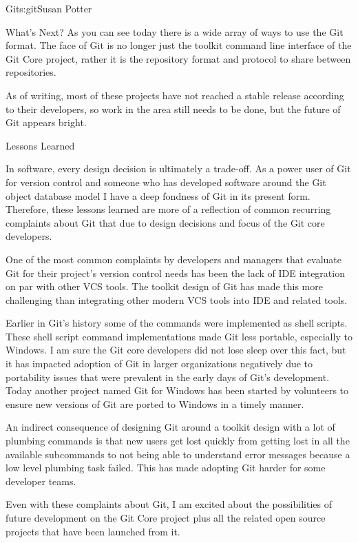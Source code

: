 \begin{aosachapter}{Git}{s:git}{Susan Potter}
\begin{aosasect1}{What's Next?}
As you can see today there is a wide array of ways to use the Git format.
The face of Git is no longer just the toolkit command line interface of
the Git Core project, rather it is the repository format and protocol to
share between repositories.

As of writing, most of these projects have not reached a stable release
according to their developers, so work in the area still needs to be done,
but the future of Git appears bright.

\end{aosasect1}

\begin{aosasect1}{Lessons Learned}

In software, every design decision is ultimately a trade-off. As a power
user of Git for version control and someone who has developed software
around the Git object database model I have a deep fondness of Git in its
present form. Therefore, these lessons learned are more of a reflection
of common recurring complaints about Git that due to design decisions and
focus of the Git core developers.

One of the most common complaints by developers and managers that evaluate
Git for their project's version control needs has been the lack of IDE
integration on par with other VCS tools. The toolkit design of Git has made
this more challenging than integrating other modern VCS tools into IDE
and related tools.

Earlier in Git's history some of the commands were implemented as shell
scripts. These shell script command
implementations made Git less portable, especially to Windows. I am
sure the Git core developers did not lose sleep over this fact, but it
has impacted adoption of Git in larger organizations negatively due to
portability issues that were prevalent in the early days of Git's
development. Today another project named Git for Windows has been started
by volunteers to ensure new versions of Git are ported to Windows in a
timely manner.

An indirect consequence of designing Git around a toolkit design
with a lot of plumbing commands is that new users get lost quickly from
getting lost in all the available subcommands to not being able to
understand error messages because a low level plumbing task failed. This
has made adopting Git harder for some developer teams.

Even with these complaints about Git, I am excited about the possibilities
of future development on the Git Core project plus all the related open
source projects that have been launched from it.

\end{aosasect1}

\end{aosachapter}
